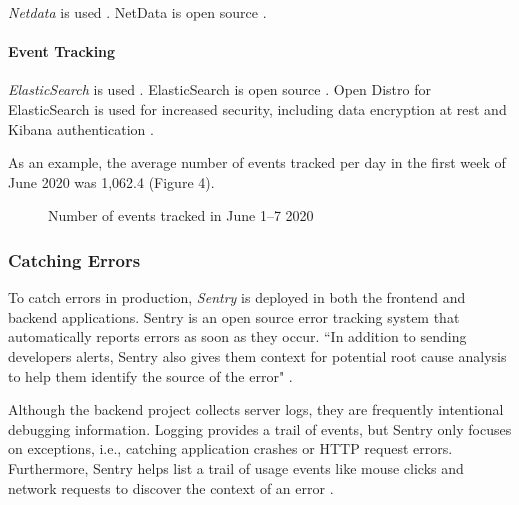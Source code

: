 \documentclass{article}
\begin{document}
\emph{Netdata} is used \cite{noauthor_netdata_nodate}. NetData is open source \cite{noauthor_netdata/netdata_2020}.

\paragraph{Event Tracking}

\emph{ElasticSearch} is used \cite{noauthor_elastic_nodate}. ElasticSearch is open source \cite{noauthor_elastic/elasticsearch_2020}. Open Distro for ElasticSearch is used for increased security, including data encryption at rest and Kibana authentication \cite{noauthor_open_nodate}.

As an example, the average number of events tracked per day in the first week of June 2020 was 1,062.4 (Figure 4).

\begin{figure}
\centering
{}
\caption{Number of events tracked in June 1–7 2020}
\end{figure}

\subsubsection{Catching Errors}

To catch errors in production, \emph{Sentry} is deployed in both the frontend and backend applications. Sentry is an open source error tracking system \cite{noauthor_sentry_nodate} that automatically reports errors as soon as they occur. ``In addition to sending developers alerts, Sentry also gives them context for potential root cause analysis to help them identify the source of the error" \cite{noauthor_sentry_nodate-1}.

Although the backend project collects server logs, they are frequently intentional debugging information. Logging provides a trail of events, but Sentry only focuses on exceptions, i.e., catching application crashes or HTTP request errors. Furthermore, Sentry helps list a trail of usage events like mouse clicks and network requests to discover the context of an error \cite{noauthor_sentry_nodate-2}.
\end{document}
